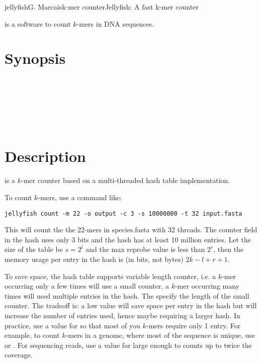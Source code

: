 \documentclass[english]{article}
\newcommand{\ddash}[1]{-\,-#1}
\newcommand{\LoOpt}[1]{\oOpt{\ddash{#1}}}
\begin{document}
\begin{Name}{1}{jellyfish}{G. Marcais}{k-mer counter}{Jellyfish: A fast k-mer counter}

 is a software to count $k$-mers in DNA sequences.

\end{Name}

\section{Synopsis}
     \LoOpt{both-strands}   \\
   \Dots \\
   \\
  \\
     \\
 

\section{Description}

 is a $k$-mer counter based on a multi-threaded hash
table implementation.

To count $k$-mers, use a command like:

\begin{verbatim}
jellyfish count -m 22 -o output -c 3 -s 10000000 -t 32 input.fasta
\end{verbatim}

This will count the the 22-mers in species.fasta with 32 threads. The
counter field in the hash uses only 3 bits and the hash has at least
10 million entries. Let the size of the table be $s=2^l$ and the max
reprobe value is less than $2^r$, then the memory usage per entry in
the hash is (in bits, not bytes) $2k-l+r+1$.

To save space, the hash table supports variable length counter, i.e. a
$k$-mer occurring only a few times will use a small counter, a $k$-mer
occurring many times will used multiple entries in the hash. The
 specify the length of the small counter. The tradeoff is: a
low value will save space per entry in the hash but will increase the
number of entries used, hence maybe requiring a larger hash. In
practice, use a value for  so that most of you $k$-mers
require only 1 entry. For example, to count $k$-mers in a genome,
where most of the sequence is unique, use  or
. For sequencing reads, use a value for
 large enough to counts up to twice the coverage.
\end{document}
